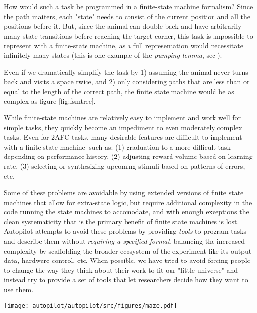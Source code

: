 How would such a task be programmed in a finite-state machine formalism? Since the path matters, each "state" needs to consist of the current position and all the positions before it. But, since the animal can double back and have arbitrarily many state transitions before reaching the target corner, this task is impossible to represent with a finite-state machine, as a full representation would necessitate infinitely many states (this is one example of the \textit{pumping lemma}, see \citep{kozenLimitationsFiniteAutomata1997}).

Even if we dramatically simplify the task by 1) assuming the animal never turns back and visits a space twice, and 2) only considering paths that are less than or equal to the length of the correct path, the finite state machine would be as complex as figure \ref{fig:fsmtree}. 

While finite-state machines are relatively easy to implement and work well for simple tasks, they quickly become an impediment to even moderately complex tasks. Even for 2AFC tasks, many desirable features are difficult to implement with a finite state machine, such as: (1) graduation to a more difficult task depending on performance history, (2) adjusting reward volume based on learning rate, (3) selecting or synthesizing upcoming stimuli based on patterns of errors\citep{bakAdaptiveOptimalTraining2016}, etc. 

Some of these problems are avoidable by using extended versions of finite state machines that allow for extra-state logic, but require additional complexity in the code running the state machines to accomodate, and with enough exceptions the clean systematicity that is the primary benefit of finite state machines is lost. Autopilot attempts to avoid these problems by providing \textit{tools} to program tasks and describe them without \textit{requiring a specified format}, balancing the increased complexity by scaffolding the broader ecosystem of the experiment like its output data, hardware control, etc. When possible, we have tried to avoid forcing people to change the way they think about their work to fit our "little universe" and instead try to provide a set of tools that let researchers decide how they want to use them.

\begin{figure*}[hb!]
\caption{State transition tree for a simplified maze task.}
\label{fig:fsmtree}
\texttt{[image: autopilot/autopilot/src/figures/maze.pdf]}
\end{figure*}


\clearpage
